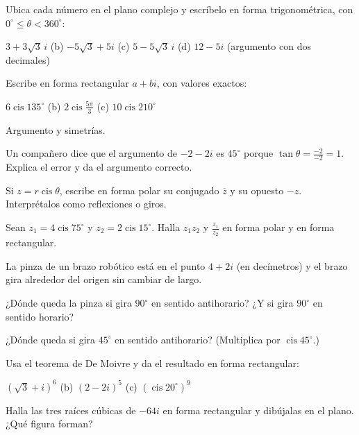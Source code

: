 \documentclass[11pt,a4paper]{article}
\newcommand{\cis}{\operatorname{cis}}
\begin{document}
\taller
\begin{ejercicios}
\item Ubica cada número en el plano complejo y escríbelo en forma trigonométrica, con $0^\circ\le\theta<360^\circ$:
  \begin{ejercicios}
  \item $3+3\sqrt3\,i$ \quad (b) $-5\sqrt3+5i$ \quad (c) $5-5\sqrt3\,i$ \quad (d) $12-5i$ (argumento con dos decimales)
  \end{ejercicios}
\item Escribe en forma rectangular $a+bi$, con valores exactos:
  \begin{ejercicios}
  \item $6\cis135^\circ$ \quad (b) $2\cis\tfrac{5\pi}{3}$ \quad (c) $10\cis210^\circ$
  \end{ejercicios}
\item Argumento y simetrías.
  \begin{ejercicios}
  \item Un compañero dice que el argumento de $-2-2i$ es $45^\circ$ porque $\tan\theta=\tfrac{-2}{-2}=1$. Explica el error y da el argumento correcto.
  \item Si $z=r\cis\theta$, escribe en forma polar su conjugado $\overline{z}$ y su opuesto $-z$. Interprétalos como reflexiones o giros.
  \end{ejercicios}
\item Sean $z_1=4\cis75^\circ$ y $z_2=2\cis15^\circ$. Halla $z_1z_2$ y $\tfrac{z_1}{z_2}$ en forma polar y en forma rectangular.
\item La pinza de un brazo robótico está en el punto $4+2i$ (en decímetros) y el brazo gira alrededor del origen sin cambiar de largo.
  \begin{ejercicios}
  \item ¿Dónde queda la pinza si gira $90^\circ$ en sentido antihorario? ¿Y si gira $90^\circ$ en sentido horario?
  \item ¿Dónde queda si gira $45^\circ$ en sentido antihorario? (Multiplica por $\cis45^\circ$.)
  \end{ejercicios}
\item Usa el teorema de De Moivre y da el resultado en forma rectangular:
  \begin{ejercicios}
  \item $(\sqrt3+i)^6$ \quad (b) $(2-2i)^5$ \quad (c) $(\cis20^\circ)^{9}$
  \end{ejercicios}
\item Halla las tres raíces cúbicas de $-64i$ en forma rectangular y dibújalas en el plano. ¿Qué figura forman?

\end{ejercicios}
\end{document}
